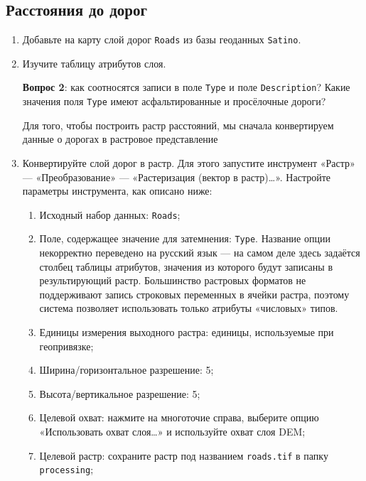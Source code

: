 \documentclass[
  12pt,
]{book}
\begin{document}
\hypertarget{weighted-overlay-roads}{%
\subsection{Расстояния до дорог}\label{weighted-overlay-roads}}

\begin{enumerate}
\def\labelenumi{\arabic{enumi}.}
\item
  Добавьте на карту слой дорог \texttt{Roads} из базы геоданных \texttt{Satino}.
\item
  Изучите таблицу атрибутов слоя.

  \textbf{Вопрос 2}: как соотносятся записи в поле \texttt{Type} и поле \texttt{Description}? Какие значения поля \texttt{Type} имеют асфальтированные и просёлочные дороги?

  Для того, чтобы построить растр расстояний, мы сначала конвертируем данные о дорогах в растровое представление
\item
  Конвертируйте слой дорог в растр. Для этого запустите инструмент «Растр» --- «Преобразование» --- «Растеризация (вектор в растр)\ldots». Настройте параметры инструмента, как описано ниже:

  \begin{enumerate}
  \def\labelenumii{\alph{enumii}.}
  \item
    Исходный набор данных: \texttt{Roads};
  \item
    Поле, содержащее значение для затемнения: \texttt{Type}. Название опции некорректно переведено на русский язык --- на самом деле здесь задаётся столбец таблицы атрибутов, значения из которого будут записаны в результирующий растр. Большинство растровых форматов не поддерживают запись строковых переменных в ячейки растра, поэтому система позволяет использовать только атрибуты «числовых» типов.
  \item
    Единицы измерения выходного растра: единицы, используемые при геопривязке;
  \item
    Ширина/горизонтальное разрешение: 5;
  \item
    Высота/вертикальное разрешение: 5;
  \item
    Целевой охват: нажмите на многоточие справа, выберите опцию «Использовать охват слоя\ldots» и используйте охват слоя DEM;
  \item
    Целевой растр: сохраните растр под названием \texttt{roads.tif} в папку \texttt{processing};
  \end{enumerate}


\end{enumerate}
\end{document}
